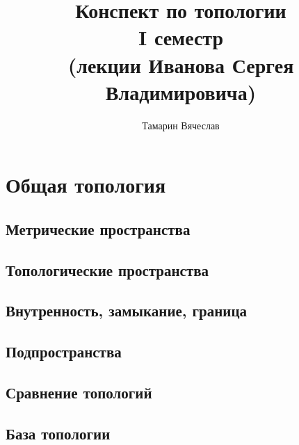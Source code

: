 \documentclass[11pt]{book}
\title{Конспект по топологии \\
    I семестр \\
(лекции Иванова Сергея Владимировича)}
\author{Тамарин Вячеслав}
\theoremstyle{definition}
\theoremstyle{plain}
\theoremstyle{plain}
\theoremstyle{definition}
\theoremstyle{remark}
\begin{document}
\maketitle
\clearpage
\tableofcontents
\clearpage

\chapter{Общая топология}
\section{Метрические пространства}
\section{Топологические пространства}
\section{Внутренность, замыкание, граница}
\section{Подпространства}
\section{Сравнение топологий}
\section{База топологии}
\end{document}

